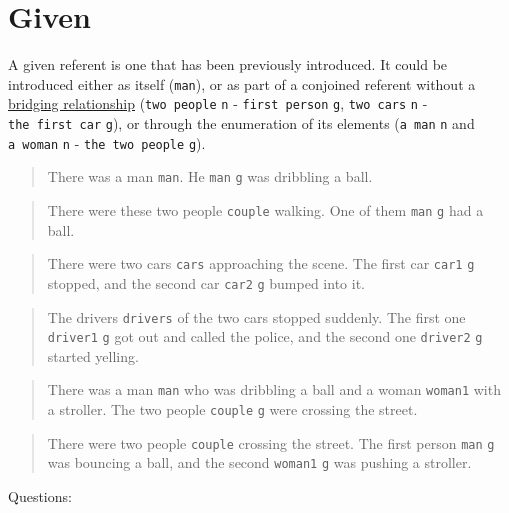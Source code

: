 \documentclass[
]{book}
\begin{document}
\hypertarget{given}{%
\section{Given}\label{given}}

A given referent is one that has been previously introduced.
It could be introduced either as itself (\texttt{man}),
or as part of a conjoined referent without a \protect\hyperlink{bridging-relationships}{bridging relationship}
(\texttt{two\ people} \texttt{n} - \texttt{first\ person} \texttt{g}, \texttt{two\ cars} \texttt{n} - \texttt{the\ first\ car} \texttt{g}),
or through the enumeration of its elements (\texttt{a\ man} \texttt{n} and \texttt{a\ woman} \texttt{n} - \texttt{the\ two\ people} \texttt{g}).

\begin{quote}
There was a man \texttt{man}.
He \texttt{man} \texttt{g} was dribbling a ball.
\end{quote}

\begin{quote}
There were these two people \texttt{couple} walking.
One of them \texttt{man} \texttt{g} had a ball.
\end{quote}

\begin{quote}
There were two cars \texttt{cars} approaching the scene.
The first car \texttt{car1} \texttt{g} stopped, and the second car \texttt{car2} \texttt{g} bumped into it.
\end{quote}

\begin{quote}
The drivers \texttt{drivers} of the two cars stopped suddenly.
The first one \texttt{driver1} \texttt{g} got out and called the police,
and the second one \texttt{driver2} \texttt{g} started yelling.
\end{quote}

\begin{quote}
There was a man \texttt{man} who was dribbling a ball and a woman \texttt{woman1} with a stroller.
The two people \texttt{couple} \texttt{g} were crossing the street.
\end{quote}

\begin{quote}
There were two people \texttt{couple} crossing the street.
The first person \texttt{man} \texttt{g} was bouncing a ball,
and the second \texttt{woman1} \texttt{g} was pushing a stroller.
\end{quote}

Questions:
\end{document}
